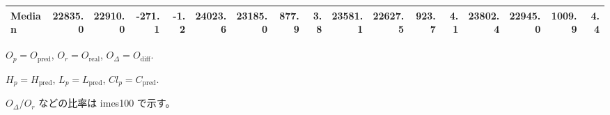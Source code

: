 \begin{threeparttable}
{\begin{tabular}{lrrrrrrrrrrrrrrrr}
 Median & 22835.0 & 22910.0 &     -271.1 &           -1.2 & 24023.6 & 23185.0 &      877.9 &            3.8 & 23581.1 & 22627.5 &      923.7 &            4.1 & 23802.4 & 22945.0 &      1009.9 &              4.4 \\
\bottomrule
\end{tabular}
}
\begin{tablenotes}\footnotesize
\item $O_p=O_{\text{pred}}$, $O_r=O_{\text{real}}$, $O_\Delta=O_{\text{diff}}$.
\item $H_p=H_{\text{pred}}$, $L_p=L_{\text{pred}}$, $Cl_p=C_{\text{pred}}$.
\item $O_\Delta/O_r$ などの比率は 	imes100 で示す。
\end{tablenotes}
\end{threeparttable}
\endgroup
